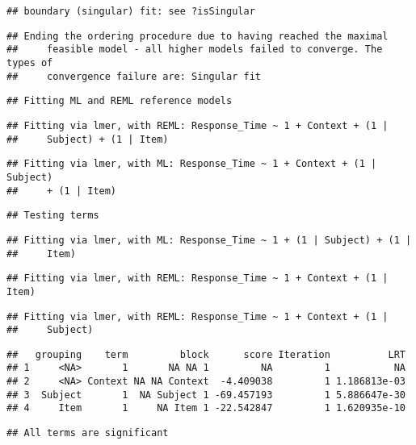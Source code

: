 \documentclass[
]{article}
\begin{document}
\begin{verbatim}
## boundary (singular) fit: see ?isSingular
\end{verbatim}

\begin{verbatim}
## Ending the ordering procedure due to having reached the maximal
##     feasible model - all higher models failed to converge. The types of
##     convergence failure are: Singular fit
\end{verbatim}

\begin{verbatim}
## Fitting ML and REML reference models
\end{verbatim}

\begin{verbatim}
## Fitting via lmer, with REML: Response_Time ~ 1 + Context + (1 |
##     Subject) + (1 | Item)
\end{verbatim}

\begin{verbatim}
## Fitting via lmer, with ML: Response_Time ~ 1 + Context + (1 | Subject)
##     + (1 | Item)
\end{verbatim}

\begin{verbatim}
## Testing terms
\end{verbatim}

\begin{verbatim}
## Fitting via lmer, with ML: Response_Time ~ 1 + (1 | Subject) + (1 |
##     Item)
\end{verbatim}

\begin{verbatim}
## Fitting via lmer, with REML: Response_Time ~ 1 + Context + (1 | Item)
\end{verbatim}

\begin{verbatim}
## Fitting via lmer, with REML: Response_Time ~ 1 + Context + (1 |
##     Subject)
\end{verbatim}

\begin{verbatim}
##   grouping    term         block      score Iteration          LRT
## 1     <NA>       1       NA NA 1         NA         1           NA
## 2     <NA> Context NA NA Context  -4.409038         1 1.186813e-03
## 3  Subject       1  NA Subject 1 -69.457193         1 5.886647e-30
## 4     Item       1     NA Item 1 -22.542847         1 1.620935e-10
\end{verbatim}

\begin{verbatim}
## All terms are significant
\end{verbatim}
\end{document}
